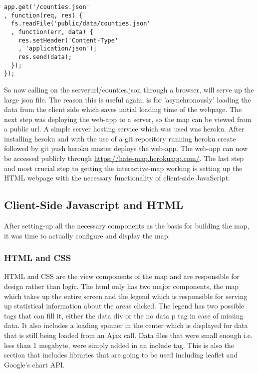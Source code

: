 \documentclass[twoside]{article}
\begin{document}
\begin{multicols}{2}
\begin{verbatim}
app.get('/counties.json'
, function(req, res) {
  fs.readFile('public/data/counties.json'
  , function(err, data) {
    res.setHeader('Content-Type'
    , 'application/json');
    res.send(data);
  });
});
\end{verbatim}
So now calling on the serverurl/counties.json through a browser, will serve up the large json file. The reason this is useful again, is for 'asynchronously' loading the data from the client side which saves initial loading time of the webpage. 
The next step was deploying the web-app to a server, so the map can be viewed from a public url. A simple server hosting service which was used was heroku. After installing heroku and with the use of a git repository running heroku create followed by git push heroku master deploys the web-app. 
The web-app can now be accessed publicly through \url{https://hate-map.herokuapp.com/}. The last step and most crucial step to getting the interactive-map 
working is setting up the HTML webpage with the necessary functionality of client-side JavaScript. 

\subsection{Client-Side Javascript and HTML}

After setting-up all the necessary components as the basis for building the map, it was time to actually configure and display the map. 

\subsubsection{HTML and CSS}
HTML and CSS are the view components of the map and are responsible for design rather than logic. 
The html only has two major components, the map which takes up the entire screen and the legend which is responsible for serving up statistical information about the areas clicked. The legend has two possible tags that can fill it, either the data div or the no data p tag in case of missing data. It also includes a loading spinner in the center which is displayed for data that is still being loaded from an Ajax call. Data files that were small enough i.e. less than 1 megabyte, were simply added in an include tag. This is also the section that includes libraries that are going to be used including leaflet and Google’s chart API.

\begin{verbatim}


\end{verbatim}
\end{multicols}
\end{document}
